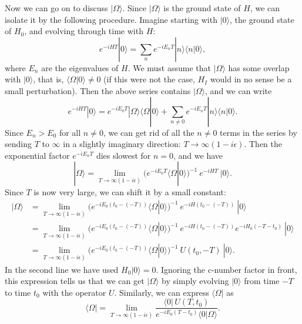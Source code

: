 Now we can go on to discuss $|\Omega\rangle$.  Since $|\Omega\rangle$ is the
ground state of $H$, we can isolate it by the following procedure.  Imagine
starting with $|0\rangle$, the ground state of $H_0$, and evolving through
time with $H$:
\begin{equation}
  e^{-iHT}|0\rangle = \sum_n e^{-iE_nT}|n\rangle\langle n|0\rangle,
\end{equation}
where $E_n$ are the eigenvalues of $H$.  We must assume that $|\Omega\rangle$
has some overlap with $|0\rangle$, that is, $\langle\Omega|0\rangle\neq 0$
(if this were not the case, $H_I$ would in no sense be a small perturbation).
Then the above series contains $|\Omega\rangle$, and we can write
\begin{equation}
  e^{-iHT}|0\rangle = e^{-iE_0T}|\Omega\rangle\langle\Omega|0\rangle
    + \sum_{n\neq 0}e^{-iE_nT}|n\rangle\langle n|0\rangle .
\end{equation}
Since $E_n > E_0$ for all $n\neq 0$, we can get rid of all the $n\neq 0$
terms in the series by sending $T$ to $\infty$ in a slightly imaginary
direction: $T\to\infty(1-i\epsilon)$.  Then the exponential factor
$e^{-iE_nT}$ dies slowest for $n=0$, and we have
\begin{equation}
  |\Omega\rangle = \lim_{T\to\infty(1-i\epsilon)}
    \bigl( e^{-iE_0T}\langle\Omega|0\rangle \bigr)^{-1}\ e^{-iHT}\ |0\rangle .
  \label{eq:4.27}
\end{equation}
Since $T$ is now very large, we can shift it by a small constant:
\begin{equation}
  \begin{aligned}
    |\Omega\rangle &= \lim_{T\to\infty(1-i\epsilon)}
      \bigl( e^{-iE_0(t_0-(-T))}\langle\Omega|0\rangle \bigr)^{-1}
      \ e^{-iH(t_0-(-T))}\ |0\rangle\\
    &= \lim_{T\to\infty(1-i\epsilon)}
      \bigl( e^{-iE_0(t_0-(-T))}\langle\Omega|0\rangle \bigr)^{-1}
      \ e^{-iH(t_0-(-T))}e^{-iH_0(-T-t_0)}\ |0\rangle\\
    &= \lim_{T\to\infty(1-i\epsilon)}
      \bigl( e^{-iE_0(t_0-(-T))}\langle\Omega|0\rangle \bigr)^{-1}
      \ U(t_0, -T)\ |0\rangle .
  \end{aligned}
  \label{eq:4.28}
\end{equation}
In the second line we have used $H_0|0\rangle = 0$.  Ignoring the c-number
factor in front, this expression tells us that we can get $|\Omega\rangle$ by
simply evolving $|0\rangle$ from time $-T$ to time $t_0$ with the operator
$U$.  Similarly, we can express $\langle\Omega|$ as
\begin{equation}
  \langle\Omega| = \lim_{T\to\infty(1-i\epsilon)}
    \frac{\langle 0|\,U(T, t_0)}
      {e^{-iE_0(T-t_0)}\langle 0|\Omega\rangle} .
\end{equation}

